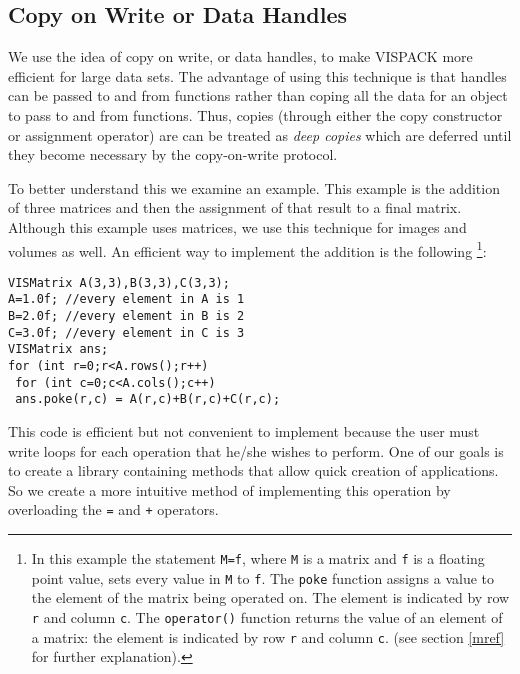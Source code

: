 \subsection{Copy on Write or Data Handles}
\label{cow}
We use the idea of copy on write, or data handles,
to make VISPACK more efficient for large data sets.
The advantage of using this technique is that handles can be
passed to and from functions rather than coping all the
data for an object to pass to and from functions.
Thus, copies (through either the copy constructor or assignment 
operator) are can be treated as {\em deep copies} which are deferred 
until they become necessary by the copy-on-write protocol.

To better understand this we examine an example.  This example
is the addition of three matrices and then the assignment of that
result to a final matrix.
Although this example uses matrices, we
use this technique for images and volumes as well.
An efficient way to implement the addition is the following \footnote{
In this example the statement {\tt M=f}, where {\tt M} is
a matrix and {\tt f} is a floating point value, sets
every value in {\tt M} to {\tt f}.  The {\tt poke} function
assigns a value to the element of the matrix being operated on.
The element is indicated by row {\tt r} and column {\tt c}.
The {\tt operator()} function returns the value of an element of
a matrix:  the element is indicated by row {\tt r} and column {\tt c}. 
(see section \ref{mref} for further explanation).}:
\begin{list}{}{\setlength{\partopsep}{-1in}
\setlength{\topsep}{0in} \setlength{\labelwidth}{1in}
\setlength{\leftmargin}{0.5in} \setlength{\labelsep}{0.2in}}
\item {\tt VISMatrix A(3,3),B(3,3),C(3,3);}\\
{\tt A=1.0f; //every element in A is 1}\\
{\tt B=2.0f; //every element in B is 2}\\
{\tt C=3.0f; //every element in C is 3}\\
{\tt VISMatrix ans;}\\
{\tt for (int r=0;r<A.rows();r++) }\\
{\tt \hspace*{0.25in} for (int c=0;c<A.cols();c++)}\\
{\tt \hspace*{0.5in} ans.poke(r,c) = A(r,c)+B(r,c)+C(r,c);}
\end{list}
This code is efficient but not convenient to implement because
the user must write loops for each operation that he/she wishes to
perform.
One of our goals is to create a library containing
methods that allow quick creation of applications.
So we create a more intuitive method of implementing this operation
by overloading the {\tt =} and {\tt +} operators.

